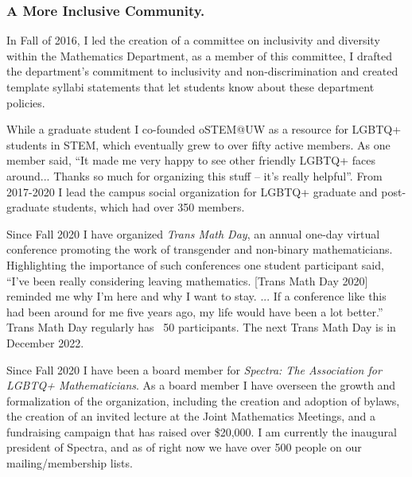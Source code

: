 \documentclass[11pt,reqno]{amsart}
\theoremstyle{remark}
\begin{document}

\subsubsection{A More Inclusive Community.} In Fall of 2016, I led the creation of a committee on inclusivity and diversity within the Mathematics Department, as a member of this committee, I drafted the department's commitment to inclusivity and non-discrimination and created template syllabi statements that let students know about these department policies. 

While a graduate student I co-founded oSTEM@UW as a resource for LGBTQ+ students in STEM, which eventually grew to over fifty active members. As one member said, ``It made me very happy to see other friendly LGBTQ+ faces around... Thanks so much for organizing this stuff -- it's really helpful''. %
From 2017-2020 I lead the campus social organization for LGBTQ+ graduate and post-graduate students, which had over 350 members. %

Since Fall 2020 I have organized \textit{Trans Math Day}, an annual one-day virtual conference promoting the work of transgender and non-binary mathematicians. Highlighting the importance of such conferences one student participant said, ``I've been really considering leaving mathematics.  [Trans Math Day 2020] reminded me why I'm here and why I want to stay. ... If a conference like this had been around for me five years ago, my life would have been a lot better.'' Trans Math Day regularly has ~50 participants. The next Trans Math Day is in December 2022. 

Since Fall 2020 I have been a board member for \textit{Spectra: The Association for LGBTQ+ Mathematicians}. As a board member I have overseen the growth and formalization of the organization, including the creation and adoption of bylaws, the creation of an invited lecture at the Joint Mathematics Meetings, and a fundraising campaign that has raised over \$20,000. I am currently the inaugural president of Spectra, and as of right now we have over 500 people on our mailing/membership lists.  
\end{document}
